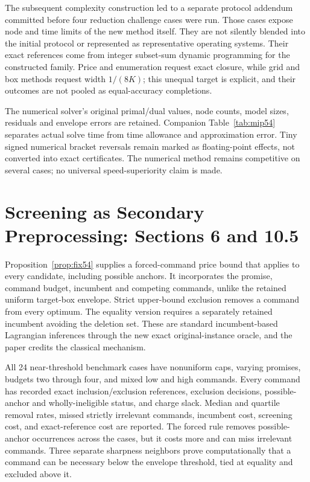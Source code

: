 The subsequent complexity construction led to a separate protocol addendum committed before four reduction challenge cases were run. Those cases expose node and time limits of the new method itself. They are not silently blended into the initial protocol or represented as representative operating systems. Their exact references come from integer subset-sum dynamic programming for the constructed family. Price and enumeration request exact closure, while grid and box methods request width $1/(8K)$; this unequal target is explicit, and their outcomes are not pooled as equal-accuracy completions.

The numerical solver's original primal/dual values, node counts, model sizes, residuals and envelope errors are retained. Companion Table~\ref{tab:mip54} separates actual solve time from time allowance and approximation error. Tiny signed numerical bracket reversals remain marked as floating-point effects, not converted into exact certificates. The numerical method remains competitive on several cases; no universal speed-superiority claim is made.

\section{Screening as Secondary Preprocessing: Sections 6 and 10.5}
Proposition~\ref{prop:fix54} supplies a forced-command price bound that applies to every candidate, including possible anchors. It incorporates the promise, command budget, incumbent and competing commands, unlike the retained uniform target-box envelope. Strict upper-bound exclusion removes a command from every optimum. The equality version requires a separately retained incumbent avoiding the deletion set. These are standard incumbent-based Lagrangian inferences through the new exact original-instance oracle, and the paper credits the classical mechanism.

All 24 near-threshold benchmark cases have nonuniform caps, varying promises, budgets two through four, and mixed low and high commands. Every command has recorded exact inclusion/exclusion references, exclusion decisions, possible-anchor and wholly-ineligible status, and charge slack. Median and quartile removal rates, missed strictly irrelevant commands, incumbent cost, screening cost, and exact-reference cost are reported. The forced rule removes \ForcedAnchors{} possible-anchor occurrences across the cases, but it costs more and can miss irrelevant commands. Three separate sharpness neighbors prove computationally that a command can be necessary below the envelope threshold, tied at equality and excluded above it.

